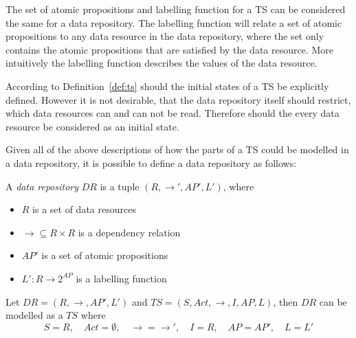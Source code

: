 The set of atomic propositions and labelling function for a TS can be considered the same for a data repository. The labelling function will relate a set of atomic propositions to any data resource in the data repository, where the set only contains the atomic propositions that are satisfied by the data resource. More intuitively the labelling function describes the values of the data resource.

According to Definition~\ref{def:ts} should the initial states of a TS be explicitly defined. However it is not desirable, that the data repository itself should restrict, which data resources can and can not be read. Therefore should the every data resource be considered as an initial state.

Given all of the above descriptions of how the parts of a TS could be modelled in a data repository, it is possible to define a data repository as follows:
\begin{definition}
A \emph{data repository} $DR$ is a tuple $\left(R, \longrightarrow', AP', L' \right)$, where
\begin{itemize}
  \item $R$ is a set of data resources
  \item $\longrightarrow \subseteq R \times R$ is a dependency relation
  \item $AP'$ is a set of atomic propositions
  \item $L' : R \rightarrow 2^{AP}$ is a labelling function
\end{itemize}
Let $DR=\left(R, \longrightarrow, AP', L' \right)$ and $TS=\left(S, Act, \longrightarrow, I, AP, L \right)$, then $DR$ can be modelled as a $TS$ where
\begin{equation*}
    S = R, \quad Act = \emptyset, \quad \longrightarrow = \longrightarrow', \quad I = R, \quad AP = AP', \quad L = L'
\end{equation*}
\end{definition}

